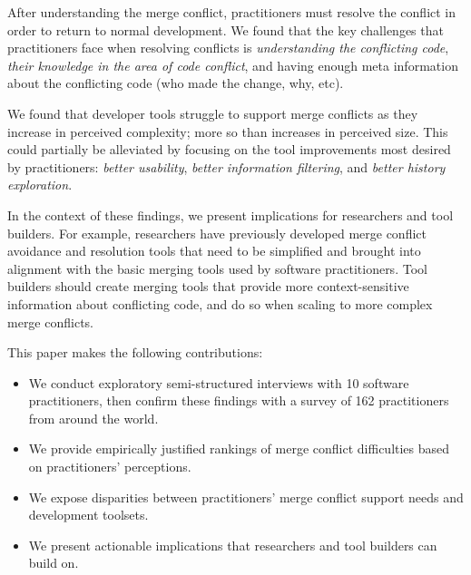 After understanding the merge conflict, practitioners must resolve the conflict in order to return to normal development.
We found that the key challenges that practitioners face when resolving conflicts is \textit{understanding the conflicting code}, \textit{their knowledge in the area of code conflict}, and having enough meta information about the conflicting code (who made the change, why, etc).

We found that developer tools struggle to support merge conflicts as they increase in perceived complexity; more so than increases in perceived size.
This could partially be alleviated by focusing on the tool improvements most desired by practitioners: \textit{better usability}, \textit{better information filtering}, and \textit{better history exploration}.

In the context of these findings, we present implications for researchers and tool builders.
For example, researchers have previously developed merge conflict avoidance and resolution tools that need to be simplified and brought into alignment with the basic merging tools used by software practitioners.
Tool builders should create merging tools that provide more context-sensitive information about conflicting code, and do so when scaling to more complex merge conflicts.

This paper makes the following contributions:
\begin{itemize}
\item We conduct exploratory semi-structured interviews with 10 software practitioners, then confirm these findings with a survey of 162 practitioners from around the world.
\item We provide empirically justified rankings of merge conflict difficulties based on practitioners' perceptions.
\item We expose disparities between practitioners' merge conflict support needs and development toolsets.
\item We present actionable implications that researchers and tool builders can build on.
\end{itemize}